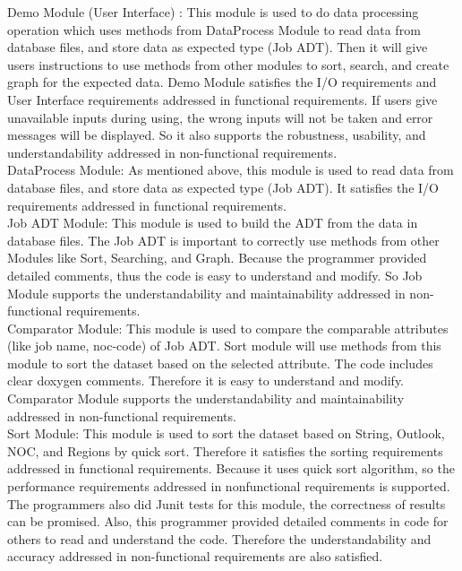 \documentclass[12pt]{article}
\begin{document}
Demo Module (User Interface) :  This module is used to do data processing operation which uses methods from DataProcess Module to read data from database files, and store data as expected type (Job ADT). Then it will give users instructions to use methods from other modules to sort, search, and create graph for the expected data. Demo Module satisfies the I/O requirements and User Interface requirements addressed in functional requirements. If users give unavailable inputs during using, the wrong inputs will not be taken and error messages will be displayed. So it also supports the robustness, usability, and understandability addressed in non-functional requirements.\\\newline 
DataProcess Module: As mentioned above, this module is used to read data from database files, and store data as expected type (Job ADT). It satisfies the I/O requirements addressed in functional requirements. \\\newline
Job ADT Module: This module is used to build the ADT from the data in database files. The Job ADT is important to correctly use methods from other Modules like Sort, Searching, and Graph. 
Because the programmer provided detailed comments, thus the code is easy to understand and modify. So Job Module supports the understandability and maintainability addressed in non-functional requirements.\\\newline
Comparator Module: This module is used to compare the comparable attributes (like job name, noc-code) of Job ADT. Sort module will use methods from this module to sort the dataset based on the selected attribute. The code includes clear doxygen comments. Therefore it is easy to understand and modify. Comparator Module supports the understandability and maintainability addressed in non-functional requirements.\\\newline
Sort Module: This module is used to sort the dataset based on String, Outlook, NOC, and Regions by quick sort. Therefore it satisfies the sorting requirements addressed in functional requirements. Because it uses quick sort algorithm, so the performance requirements addressed in nonfunctional requirements is supported. The programmers also did Junit tests for this module, the correctness of results can be promised. Also, this programmer provided detailed comments in code for others to read and understand the code. Therefore the understandability and accuracy addressed in non-functional requirements are also satisfied.\\\newline
\end{document}
